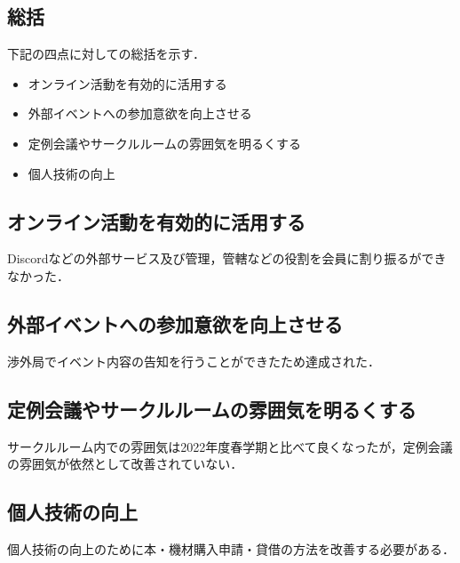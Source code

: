 \subsection*{\secondGrade{}総括}


下記の四点に対しての総括を示す．
\begin{itemize}
    \item オンライン活動を有効的に活用する
    \item 外部イベントへの参加意欲を向上させる
    \item 定例会議やサークルルームの雰囲気を明るくする
    \item 個人技術の向上
\end{itemize}

\subsection*{オンライン活動を有効的に活用する}
Discordなどの外部サービス及び管理，管轄などの役割を会員に割り振るができなかった．

\subsection*{外部イベントへの参加意欲を向上させる}
渉外局でイベント内容の告知を行うことができたため達成された．

\subsection*{定例会議やサークルルームの雰囲気を明るくする}
サークルルーム内での雰囲気は2022年度春学期と比べて良くなったが，定例会議の雰囲気が依然として改善されていない．

\subsection*{個人技術の向上}
個人技術の向上のために本・機材購入申請・貸借の方法を改善する必要がある．
